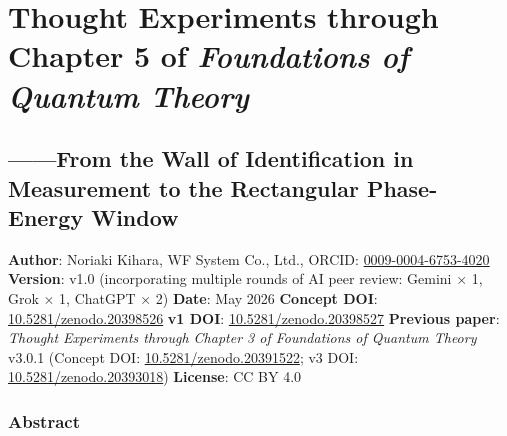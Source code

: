 \documentclass[
]{article}
\author{}
\date{}
\begin{document}
\section{\texorpdfstring{Thought Experiments through Chapter 5 of
\emph{Foundations of Quantum
Theory}}{Thought Experiments through Chapter 5 of Foundations of Quantum Theory}}\label{thought-experiments-through-chapter-5-of-foundations-of-quantum-theory}

\subsection{------From the Wall of Identification in Measurement to the
Rectangular Phase-Energy
Window}\label{from-the-wall-of-identification-in-measurement-to-the-rectangular-phase-energy-window}

\textbf{Author}: Noriaki Kihara, WF System Co., Ltd., ORCID:
\href{https://orcid.org/0009-0004-6753-4020}{0009-0004-6753-4020}
\textbf{Version}: v1.0 (incorporating multiple rounds of AI peer review:
Gemini × 1, Grok × 1, ChatGPT × 2) \textbf{Date}: May 2026
\textbf{Concept DOI}:
\href{https://doi.org/10.5281/zenodo.20398526}{10.5281/zenodo.20398526}
\textbf{v1 DOI}:
\href{https://doi.org/10.5281/zenodo.20398527}{10.5281/zenodo.20398527}
\textbf{Previous paper}: \emph{Thought Experiments through Chapter 3 of
Foundations of Quantum Theory} v3.0.1 (Concept DOI:
\href{https://doi.org/10.5281/zenodo.20391522}{10.5281/zenodo.20391522};
v3 DOI:
\href{https://doi.org/10.5281/zenodo.20393018}{10.5281/zenodo.20393018})
\textbf{License}: CC BY 4.0

\subsubsection{Abstract}\label{abstract}
\end{document}
